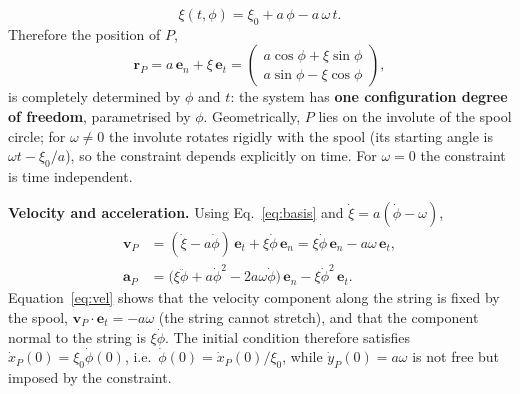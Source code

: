 \documentclass[11pt,a4paper]{article}
\newcommand{\dt}[1]{\dot{#1}}
\newcommand{\ddt}[1]{\ddot{#1}}
\newcommand{\en}{\bm{e}_n}
\newcommand{\et}{\bm{e}_t}
\begin{document}
\begin{equation}
\xi(t,\phi)=\xi_0+a\,\phi-a\,\omega\,t .
\label{eq:xi}
\end{equation}
Therefore the position of $P$,
\begin{equation}
\bm r_P=a\,\en+\xi\,\et=\begin{pmatrix}a\cos\phi+\xi\sin\phi\\ a\sin\phi-\xi\cos\phi\end{pmatrix},
\label{eq:pos}
\end{equation}
is completely determined by $\phi$ and $t$: the system has \textbf{one configuration degree of freedom}, parametrised by $\phi$.
Geometrically, $P$ lies on the involute of the spool circle; for $\omega\neq0$ the involute rotates rigidly with the spool
(its starting angle is $\omega t-\xi_0/a$), so the constraint depends explicitly on time. For $\omega=0$ the constraint is
time independent.

\textbf{Velocity and acceleration.} Using Eq.~\eqref{eq:basis} and $\dt{\xi}=a(\dt{\phi}-\omega)$,
\begin{align}
\bm v_P&=(\dt{\xi}-a\dt{\phi})\,\et+\xi\dt{\phi}\,\en=\xi\dt{\phi}\,\en-a\omega\,\et ,\label{eq:vel}\\
\bm a_P&=\big(\xi\ddt{\phi}+a\dt{\phi}^{2}-2a\omega\dt{\phi}\big)\,\en-\xi\dt{\phi}^{2}\,\et .\label{eq:acc}
\end{align}
Equation~\eqref{eq:vel} shows that the velocity component along the string is fixed by the spool, $\bm v_P\cdot\et=-a\omega$ (the
string cannot stretch), and that the component normal to the string is $\xi\dt{\phi}$. The initial condition therefore satisfies
$\dt{x}_P(0)=\xi_0\dt{\phi}(0)$, i.e.\ $\dt{\phi}(0)=\dt{x}_P(0)/\xi_0$, while $\dt{y}_P(0)=a\omega$ is not free but imposed by the constraint.
\end{document}
